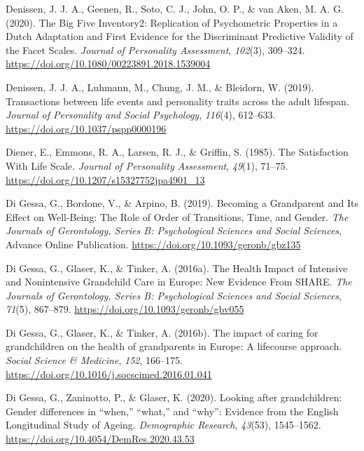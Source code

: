 \documentclass[
  english,
  man, noextraspace]{apa7}
\begin{document}
\leavevmode\hypertarget{ref-denissenBigFiveInventory2020}{}%
Denissen, J. J. A., Geenen, R., Soto, C. J., John, O. P., \& van Aken, M. A. G. (2020). The Big Five Inventory2: Replication of Psychometric Properties in a Dutch Adaptation and First Evidence for the Discriminant Predictive Validity of the Facet Scales. \emph{Journal of Personality Assessment}, \emph{102}(3), 309--324. \url{https://doi.org/10.1080/00223891.2018.1539004}

\leavevmode\hypertarget{ref-denissenTransactionsLifeEvents2019}{}%
Denissen, J. J. A., Luhmann, M., Chung, J. M., \& Bleidorn, W. (2019). Transactions between life events and personality traits across the adult lifespan. \emph{Journal of Personality and Social Psychology}, \emph{116}(4), 612--633. \url{https://doi.org/10.1037/pspp0000196}

\leavevmode\hypertarget{ref-dienerSatisfactionLifeScale1985}{}%
Diener, E., Emmons, R. A., Larsen, R. J., \& Griffin, S. (1985). The Satisfaction With Life Scale. \emph{Journal of Personality Assessment}, \emph{49}(1), 71--75. \url{https://doi.org/10.1207/s15327752jpa4901_13}

\leavevmode\hypertarget{ref-digessaBecomingGrandparentIts2019}{}%
Di Gessa, G., Bordone, V., \& Arpino, B. (2019). Becoming a Grandparent and Its Effect on Well-Being: The Role of Order of Transitions, Time, and Gender. \emph{The Journals of Gerontology, Series B: Psychological Sciences and Social Sciences}, Advance Online Publication. \url{https://doi.org/10.1093/geronb/gbz135}

\leavevmode\hypertarget{ref-digessaHealthImpactIntensive2016}{}%
Di Gessa, G., Glaser, K., \& Tinker, A. (2016a). The Health Impact of Intensive and Nonintensive Grandchild Care in Europe: New Evidence From SHARE. \emph{The Journals of Gerontology, Series B: Psychological Sciences and Social Sciences}, \emph{71}(5), 867--879. \url{https://doi.org/10.1093/geronb/gbv055}

\leavevmode\hypertarget{ref-digessaImpactCaringGrandchildren2016}{}%
Di Gessa, G., Glaser, K., \& Tinker, A. (2016b). The impact of caring for grandchildren on the health of grandparents in Europe: A lifecourse approach. \emph{Social Science \& Medicine}, \emph{152}, 166--175. \url{https://doi.org/10.1016/j.socscimed.2016.01.041}

\leavevmode\hypertarget{ref-digessaLookingGrandchildrenGender2020}{}%
Di Gessa, G., Zaninotto, P., \& Glaser, K. (2020). Looking after grandchildren: Gender differences in ``when,'' ``what,'' and ``why'': Evidence from the English Longitudinal Study of Ageing. \emph{Demographic Research}, \emph{43}(53), 1545--1562. \url{https://doi.org/10.4054/DemRes.2020.43.53}
\end{document}
